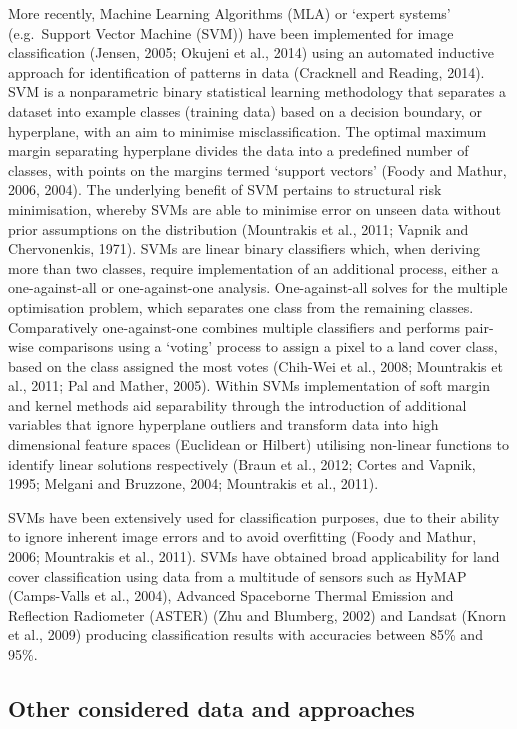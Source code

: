 \documentclass[]{book}
\begin{document}
More recently, Machine Learning Algorithms (MLA) or `expert systems'
(e.g.~Support Vector Machine (SVM)) have been implemented for image
classification (Jensen, 2005; Okujeni et al., 2014) using an automated
inductive approach for identification of patterns in data (Cracknell and
Reading, 2014). SVM is a nonparametric binary statistical learning
methodology that separates a dataset into example classes (training
data) based on a decision boundary, or hyperplane, with an aim to
minimise misclassification. The optimal maximum margin separating
hyperplane divides the data into a predefined number of classes, with
points on the margins termed `support vectors' (Foody and Mathur, 2006,
2004). The underlying benefit of SVM pertains to structural risk
minimisation, whereby SVMs are able to minimise error on unseen data
without prior assumptions on the distribution (Mountrakis et al., 2011;
Vapnik and Chervonenkis, 1971). SVMs are linear binary classifiers
which, when deriving more than two classes, require implementation of an
additional process, either a one-against-all or one-against-one
analysis. One-against-all solves for the multiple optimisation problem,
which separates one class from the remaining classes. Comparatively
one-against-one combines multiple classifiers and performs pair-wise
comparisons using a `voting' process to assign a pixel to a land cover
class, based on the class assigned the most votes (Chih-Wei et al.,
2008; Mountrakis et al., 2011; Pal and Mather, 2005). Within SVMs
implementation of soft margin and kernel methods aid separability
through the introduction of additional variables that ignore hyperplane
outliers and transform data into high dimensional feature spaces
(Euclidean or Hilbert) utilising non-linear functions to identify linear
solutions respectively (Braun et al., 2012; Cortes and Vapnik, 1995;
Melgani and Bruzzone, 2004; Mountrakis et al., 2011).

SVMs have been extensively used for classification purposes, due to
their ability to ignore inherent image errors and to avoid overfitting
(Foody and Mathur, 2006; Mountrakis et al., 2011). SVMs have obtained
broad applicability for land cover classification using data from a
multitude of sensors such as HyMAP (Camps-Valls et al., 2004), Advanced
Spaceborne Thermal Emission and Reflection Radiometer (ASTER) (Zhu and
Blumberg, 2002) and Landsat (Knorn et al., 2009) producing
classification results with accuracies between 85\% and 95\%.

\subsection{Other considered data and
approaches}\label{other-considered-data-and-approaches-1}
\end{document}
